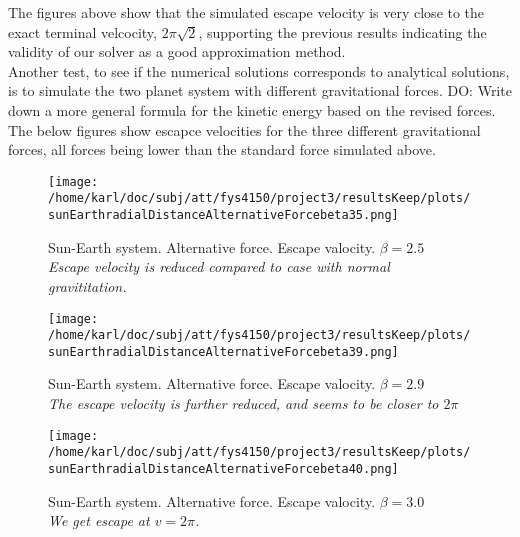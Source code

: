 \documentclass{article}
\begin{document}
The figures above show that the simulated escape velocity is very close to the exact terminal velcocity, $2 \pi \sqrt{2}$, supporting the previous results indicating the validity of our solver as a good approximation method.\\

Another test, to see if the numerical solutions corresponds to analytical solutions, is to simulate the two planet system with different gravitational forces. DO: Write down a more general formula for the kinetic energy based on the revised forces.\\

The below figures show escapce velocities for the three different gravitational forces, all forces being lower than the standard force simulated above.


\begin{minipage}{.3\textwidth} 
	\begin{figure}[H]
		\centering
		\texttt{[image: /home/karl/doc/subj/att/fys4150/project3/resultsKeep/plots/sunEarthradialDistanceAlternativeForcebeta35.png]}
		\caption{Sun-Earth system. Alternative force. Escape valocity. $\beta = 2.5$ \\ \textit{Escape velocity is reduced compared to case with normal gravititation.}}
		\label{1}
	\end{figure}
\end{minipage}\hfill
\begin{minipage}{.3\textwidth} 
	\begin{figure}[H]
		\centering
		\texttt{[image: /home/karl/doc/subj/att/fys4150/project3/resultsKeep/plots/sunEarthradialDistanceAlternativeForcebeta39.png]}
		\caption{Sun-Earth system. Alternative force. Escape valocity. $\beta = 2.9$ \\ \textit{The escape velocity is further reduced, and seems to be closer to $2  \pi$}}
		\label{1}
	\end{figure}
\end{minipage}\hfill
\begin{minipage}{.3\textwidth} 
	\begin{figure}[H]
		\centering
		\texttt{[image: /home/karl/doc/subj/att/fys4150/project3/resultsKeep/plots/sunEarthradialDistanceAlternativeForcebeta40.png]}
		\caption{Sun-Earth system. Alternative force. Escape valocity. $\beta = 3.0$ \\ \textit{We get escape at $v = 2\pi$.}}
		\label{1}
	\end{figure}
\end{minipage}\hfill
\vspace{2ex}
\end{document}

